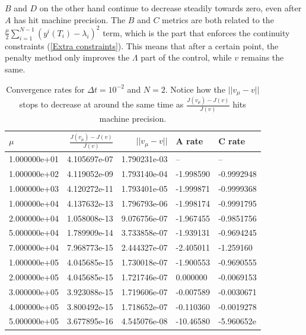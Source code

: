 \\
\\
$B$ and $D$ on the other hand continue to decrease steadily towards zero, even after $A$ has hit machine precision. The $B$ and $C$ metrics are both related to the $\frac{\mu }{2}\sum_{i=1}^{N-1}(y^i(T_{i})-\lambda_i)^2$ term, which is the part that enforces the continuity constraints (\ref{Extra constraints}). This means that after a certain point, the penalty method only improves the $\Lambda$ part of the control, while $v$ remains the same. 
\begin{table}[!h]
\centering
\caption{Convergence rates for $\Delta t=10^{-2}$ and $N=2$. Notice how the $||v_{\mu}-v||$ stops to decrease at around the same time as $\frac{J(v_{\mu})-J(v)}{J(v)}$ hits machine precision.}
\label{Cosn_rate_table}
\begin{tabular}{lrrll}
\toprule
{} $\mu$&  $\frac{J(v_{\mu})-J(v)}{J(v)}$ &   $||v_{\mu}-v||$ &        A rate &        C rate \\
\midrule
1.000000e+01 &      4.105697e-07 & 1.790231e-03 &            -- &            -- \\
1.000000e+02 &      4.119052e-09 & 1.793140e-04 & -1.998590 & -0.9992948 \\
1.000000e+03 &      4.120272e-11 & 1.793401e-05 & -1.999871 & -0.9999368 \\
1.000000e+04 &      4.137632e-13 & 1.796793e-06 & -1.998174 & -0.9991795 \\
2.000000e+04 &      1.058008e-13 & 9.076756e-07 & -1.967455 & -0.9851756 \\
5.000000e+04 &      1.789909e-14 & 3.733858e-07 & -1.939131 & -0.9694245 \\
7.000000e+04 &      7.968773e-15 & 2.444327e-07 & -2.405011 & -1.259160 \\
1.000000e+05 &      4.045685e-15 & 1.730018e-07 & -1.900553 & -0.9690555 \\
2.000000e+05 &      4.045685e-15 & 1.721746e-07 &  0.000000 & -0.0069153 \\
3.000000e+05 &      3.923088e-15 & 1.719606e-07 & -0.007589 & -0.0030671 \\
4.000000e+05 &      3.800492e-15 & 1.718652e-07 & -0.110360 & -0.0019278 \\
5.000000e+05 &      3.677895e-16 & 4.545076e-08 & -10.46580 & -5.960652e \\
\bottomrule
\end{tabular}

\end{table}

